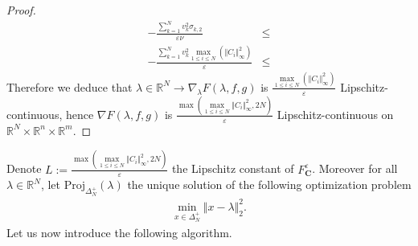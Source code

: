 \begin{proof}
\begin{align*}
 - \frac{\sum_{k=1}^N v_k^2 \sigma_{k,2}}{\varepsilon\nu}  & \leq \\
  - \frac{\sum_{k=1}^N v_k^2 \max\limits_{1\leq i\leq N}(\Vert C_i\Vert_{\infty}^2) }{\varepsilon}  & \leq 
 \end{align*}
 Therefore we deduce that $\lambda\in\mathbb{R}^N \rightarrow \nabla_{\lambda} F(\lambda,f,g)$ is $\frac{\max\limits_{1\leq i\leq N}(\Vert C_i\Vert_{\infty}^2)}{\varepsilon}$ Lipschitz-continuous, hence $\nabla F(\lambda,f,g)$ is $\frac{\max\left(\max\limits_{1\leq i\leq N}\Vert C_i\Vert_{\infty}^2,2N\right)}{\varepsilon}$ Lipschitz-continuous on $\mathbb{R}^N\times \mathbb{R}^n \times\mathbb{R}^m$. 
\end{proof}



Denote $L:= \frac{\max\left(\max\limits_{1\leq i\leq N}\Vert C_i\Vert_{\infty}^2,2N\right)}{\varepsilon}$ the  Lipschitz constant of $F_{\mathbf{C}}^{\varepsilon}$. Moreover for all $\lambda\in\mathbb{R}^N$, let $\text{Proj}_{\Delta_N^{+}}(\lambda)$ the unique solution of the following optimization problem
\begin{align}
\label{prob:proj}
    \min_{x\in\Delta_N^{+}} \Vert x - \lambda\Vert_2^2.
\end{align}
Let us now introduce the following algorithm.





